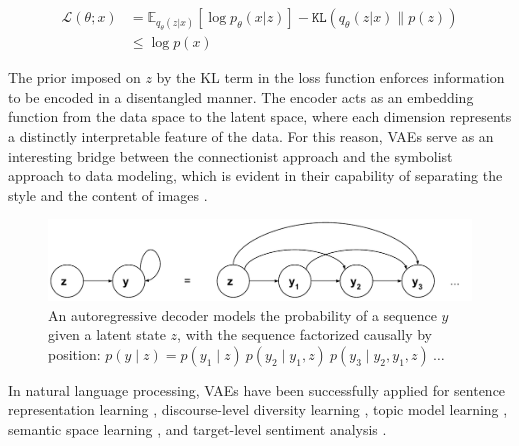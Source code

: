 \documentclass[11pt]{article}
\begin{document}
\begin{align*}
  \mathcal{L} \left( \theta ; x \right)
  &= \mathbb{E}_{q_{\theta} \left( z | x \right)} [ \log p_{\theta} \left( x | z \right)]
    - \mathtt{KL} \left( q_{\theta} \left( z | x \right) \| p \left( z \right) \right)\\
  &\leq \log p\left(x\right)
\end{align*}

The prior imposed on \(z\) by the KL term in the loss function enforces information
to be encoded in a disentangled manner.
The encoder acts as an embedding function from the data space to the latent space,
where each dimension represents a distinctly interpretable feature of the data.
For this reason,
VAEs serve as an interesting bridge between the connectionist approach and the symbolist approach to data modeling,
which is evident in their capability of separating the style and the content of images \parencite{kingma2014semi}.

\begin{figure}
  \centering\includegraphics[width=\linewidth]{autoreg.pdf}
  \caption[]{\label{fig:autoreg}An autoregressive decoder models
    the probability of a sequence \(y\) given a latent state \(z\),
    with the sequence factorized causally by position:
    \small{\( p(y \mid z) = p(y_{1} \mid z)\ p(y_{2} \mid y_{1}, z)\ p(y_{3} \mid y_{2}, y_{1}, z)\ \ldots \)}}
\end{figure}

In natural language processing,
VAEs have been successfully applied for
sentence representation learning \parencite{bowman2015generating},
discourse-level diversity learning \parencite{zhao2017learning},
topic model learning \parencite{srivastava2017autoencoding},
semantic space learning \parencite{jang2018recurrent},
and target-level sentiment analysis \parencite{xu2018semi}.
\end{document}
